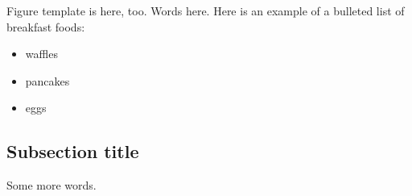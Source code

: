 \documentclass[11pt]{article}
\begin{document}
Figure template is here, too. Words here. Here is an example of a bulleted list of breakfast foods:
\begin{itemize}
    \item waffles
    \item pancakes
    \item eggs
\end{itemize}

\subsection{Subsection title}
\label{sub:subsection_label}

Some more words.






\end{document}
